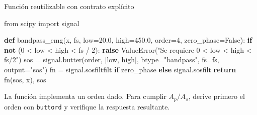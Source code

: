 \documentclass[
  ignorenonframetext,
  aspectratio=169,
  spanish,
  professionalfonts]{beamer}
\newenvironment{Shaded}{\begin{snugshade}}{\end{snugshade}}
\newcommand{\ControlFlowTok}[1]{\textcolor[rgb]{0.00,0.23,0.31}{\textbf{#1}}}
\newcommand{\DecValTok}[1]{\textcolor[rgb]{0.68,0.00,0.00}{#1}}
\newcommand{\FloatTok}[1]{\textcolor[rgb]{0.68,0.00,0.00}{#1}}
\newcommand{\ImportTok}[1]{\textcolor[rgb]{0.00,0.46,0.62}{#1}}
\newcommand{\KeywordTok}[1]{\textcolor[rgb]{0.00,0.23,0.31}{\textbf{#1}}}
\newcommand{\NormalTok}[1]{\textcolor[rgb]{0.00,0.23,0.31}{#1}}
\newcommand{\OperatorTok}[1]{\textcolor[rgb]{0.37,0.37,0.37}{#1}}
\newcommand{\PreprocessorTok}[1]{\textcolor[rgb]{0.68,0.00,0.00}{#1}}
\newcommand{\StringTok}[1]{\textcolor[rgb]{0.13,0.47,0.30}{#1}}
\newcommand{\VariableTok}[1]{\textcolor[rgb]{0.07,0.07,0.07}{#1}}
\begin{document}
\begin{frame}[fragile]{Función reutilizable con contrato explícito}
\protect{}\label{funciuxf3n-reutilizable-con-contrato-expluxedcito}
\begin{Shaded}
\begin{Highlighting}[]
\ImportTok{from}\NormalTok{ scipy }\ImportTok{import}\NormalTok{ signal}

\KeywordTok{def}\NormalTok{ bandpass\_emg(x, fs, low}\OperatorTok{=}\FloatTok{20.0}\NormalTok{, high}\OperatorTok{=}\FloatTok{450.0}\NormalTok{,}
\NormalTok{                 order}\OperatorTok{=}\DecValTok{4}\NormalTok{, zero\_phase}\OperatorTok{=}\VariableTok{False}\NormalTok{):}
    \ControlFlowTok{if} \KeywordTok{not}\NormalTok{ (}\DecValTok{0} \OperatorTok{\textless{}}\NormalTok{ low }\OperatorTok{\textless{}}\NormalTok{ high }\OperatorTok{\textless{}}\NormalTok{ fs }\OperatorTok{/} \DecValTok{2}\NormalTok{):}
        \ControlFlowTok{raise} \PreprocessorTok{ValueError}\NormalTok{(}\StringTok{"Se requiere 0 \textless{} low \textless{} high \textless{} fs/2"}\NormalTok{)}
\NormalTok{    sos }\OperatorTok{=}\NormalTok{ signal.butter(order, [low, high],}
\NormalTok{                        btype}\OperatorTok{=}\StringTok{"bandpass"}\NormalTok{, fs}\OperatorTok{=}\NormalTok{fs, output}\OperatorTok{=}\StringTok{"sos"}\NormalTok{)}
\NormalTok{    fn }\OperatorTok{=}\NormalTok{ signal.sosfiltfilt }\ControlFlowTok{if}\NormalTok{ zero\_phase }\ControlFlowTok{else}\NormalTok{ signal.sosfilt}
    \ControlFlowTok{return}\NormalTok{ fn(sos, x), sos}
\end{Highlighting}
\end{Shaded}

\begin{tcolorbox}[enhanced jigsaw, arc=.35mm, bottomrule=.15mm, bottomtitle=1mm, breakable, colback=white, colbacktitle=quarto-callout-tip-color!10!white, colframe=quarto-callout-tip-color-frame, coltitle=black, left=2mm, leftrule=.75mm, opacityback=0, opacitybacktitle=0.6, rightrule=.15mm, title={Extensión}, titlerule=0mm, toprule=.15mm, toptitle=1mm]

La función implementa un orden dado. Para cumplir \(A_p/A_s\), derive
primero el orden con \texttt{buttord} y verifique la respuesta
resultante.

\end{tcolorbox}
\end{frame}
\end{document}
